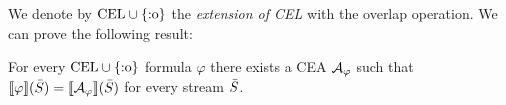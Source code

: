 We denote by $\text{CEL} \cup \{\text{:o}\}$ the \emph{extension of CEL} with the overlap operation. We can prove the following result:

\begin{theorem} \label{theo:mytheorem}
	For every $\text{CEL} \cup \{\text{:o}\}$ formula $\varphi$ there exists a CEA $\mathcal{A}_\varphi$ such that $\sem{\varphi}(\Stream) = \sem{\cA_\varphi}(\Stream)$ for every stream $\bar{S}$.
\end{theorem}


